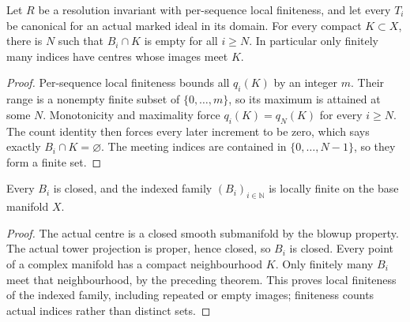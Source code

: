\begin{theorem}
\label{hir:growing-canonical-sequence-compact-tail}
\leanok
Let $R$ be a resolution invariant with per-sequence local finiteness, and
let every $T_i$ be canonical for an actual marked ideal in its domain. For
every compact $K\subset X$, there is $N$ such that $B_i\cap K$ is empty
for all $i\ge N$. In particular only finitely many indices have centres
whose images meet $K$.
\end{theorem}
\begin{proof}
Per-sequence local finiteness bounds all $q_i(K)$ by an integer $m$. Their
range is a nonempty finite subset of $\{0,\ldots,m\}$, so its maximum is
attained at some $N$. Monotonicity and maximality force $q_i(K)=q_N(K)$
for every $i\ge N$. The count identity then forces every later increment
to be zero, which says exactly $B_i\cap K=\varnothing$. The meeting indices
are contained in $\{0,\ldots,N-1\}$, so they form a finite set.
\end{proof}

\begin{theorem}
\label{hir:growing-canonical-sequence-closed-images}
\leanok
Every $B_i$ is closed, and the indexed family $(B_i)_{i\in\mathbb N}$ is
locally finite on the base manifold $X$.
\end{theorem}
\begin{proof}
The actual centre is a closed smooth submanifold by the blowup property.
The actual tower projection is proper, hence closed, so $B_i$ is closed.
Every point of a complex manifold has a compact neighbourhood $K$. Only
finitely many $B_i$ meet that neighbourhood, by the preceding theorem.
This proves local finiteness of the indexed family, including repeated or
empty images; finiteness counts actual indices rather than distinct sets.
\end{proof}

